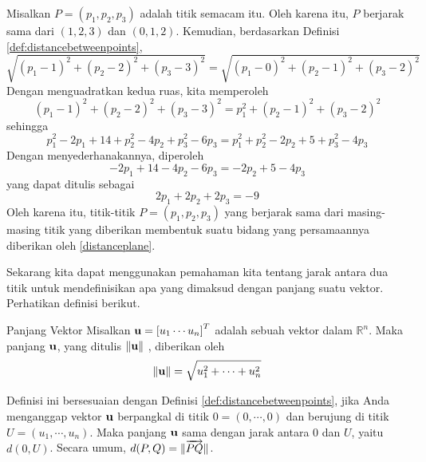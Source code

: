\begin{solution}
Misalkan $P = \left( p_1 , p_2, p_3\right) $ adalah titik semacam itu. Oleh karena itu, $P$ berjarak sama dari $\left(
1,2,3\right) $ dan $\left( 0,1,2\right) .$ 
Kemudian, berdasarkan Definisi \ref{def:distancebetweenpoints},
\begin{equation*}
\sqrt{\left( p_1 -1\right) ^{2}+\left( p_2 -2\right) ^{2}+\left( p_3-3\right) ^{2}}=
\sqrt{\left( p_1 - 0 \right)^{2}+\left( p_2-1\right) ^{2}+\left( p_3-2\right) ^{2}}
\end{equation*}
Dengan menguadratkan kedua ruas, kita memperoleh
\begin{equation*}
\left( p_1 -1\right) ^{2}+\left( p_2 -2\right) ^{2}+\left( p_3 -3\right)
^{2}=p_1^{2}+\left( p_2-1\right) ^{2}+\left( p_3 -2\right) ^{2}
\end{equation*}
sehingga
\begin{equation*}
\allowbreak p_1^{2}-2p_1+14+p_2^{2}-4p_2+p_3^{2}-6p_3=p_1^{2}+p_2^{2}-2p_2+5+p_3^{2}-4p_3
\end{equation*}
Dengan menyederhanakannya, diperoleh
\begin{equation*}
-2p_1+14-4p_2-6p_3=-2p_2+5-4p_3
\end{equation*}
yang dapat ditulis sebagai
\begin{equation}
2p_1+2p_2+2p_3=-9  \label{distanceplane}
\end{equation}
Oleh karena itu, titik-titik $P = \left(
p_1,p_2,p_3\right) $ yang berjarak sama
dari masing-masing titik yang diberikan membentuk suatu bidang yang persamaannya diberikan oleh \ref{distanceplane}.
\end{solution}

Sekarang kita dapat menggunakan pemahaman kita tentang jarak antara dua titik untuk mendefinisikan apa yang dimaksud dengan panjang suatu
vektor. Perhatikan definisi berikut.

\begin{definition}{Panjang Vektor}\label{def:lengthofvector}
Misalkan $\mathbf{u} = \left[ u_{1} \cdots u_{n} \right]^T$ adalah sebuah vektor dalam
$\mathbb{R}^n$. Maka panjang $\mathbf{u}$, yang ditulis $\| \mathbf{u} \|$ , diberikan oleh
\begin{equation*}
\|
\mathbf{u}
\|
= \sqrt{ u_{1}^2 + \cdots + u_{n}^2}
\end{equation*}
\end{definition}

Definisi ini bersesuaian dengan Definisi
\ref{def:distancebetweenpoints}, jika Anda menganggap vektor $\mathbf{u}$
berpangkal di titik $0 = \left( 0, \cdots ,0 \right)$ dan
berujung di titik $U = \left(u_1, \cdots, u_n \right)$. Maka panjang
$\mathbf{u}$ sama dengan jarak antara $0$ dan $U$, yaitu $d(0,U)$. Secara umum, $d(P,Q) = \| \overrightarrow{PQ} \|$.

